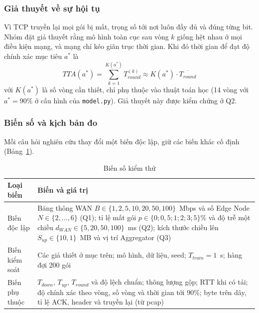 \subsubsection{Giả thuyết về sự hội tụ}
Vì TCP truyền lại mọi gói bị mất, trọng số tới nơi luôn đầy đủ và đúng từng bit. Nhóm đặt giả thuyết rằng mô hình toàn cục sau vòng $k$ giống hệt nhau ở mọi điều kiện mạng, và mạng chỉ kéo giãn trục thời gian. Khi đó thời gian để đạt độ chính xác mục tiêu $a^{*}$ là
\begin{equation}
    TTA(a^{*}) = \sum_{k=1}^{K(a^{*})} T_{round}^{(k)} \approx K(a^{*}) \cdot \overline{T_{round}}
    \label{eq:tta}
\end{equation}
với $K(a^{*})$ là số vòng cần thiết, chỉ phụ thuộc vào thuật toán học (14 vòng với $a^{*} = 90\%$ ở cấu hình của \texttt{model.py}). Giả thuyết này được kiểm chứng ở Q2.

\subsubsection{Biến số và kịch bản đo}
Mỗi câu hỏi nghiên cứu thay đổi một biến độc lập, giữ các biến khác cố định (Bảng~\ref{tab:vars}).

\begin{table}[H]
    \centering
    \caption{Biến số kiểm thử}
    \label{tab:vars}
    \begin{tabularx}{\textwidth}{>{\raggedright\arraybackslash}p{3.0cm} >{\raggedright\arraybackslash}X}
        \toprule
        \textbf{Loại biến} & \textbf{Biến và giá trị} \\
        \midrule
        Biến độc lập & Băng thông WAN $B \in \{1, 2, 5, 10, 20, 50, 100\}$~Mbps và số Edge Node $N \in \{2,\dots,6\}$ (Q1); tỉ lệ mất gói $p \in \{0; 0{,}5; 1; 2; 3; 5\}\%$ và độ trễ một chiều $d_{WAN} \in \{5, 20, 50, 100\}$~ms (Q2); kích thước chiều lên $S_{up} \in \{10, 1\}$~MB và vị trí Aggregator (Q3) \\
        \midrule
        Biến kiểm soát & Các giả thiết ở mục trên; mô hình, dữ liệu, seed; $T_{train} = 1$~s; hàng đợi 200 gói \\
        \midrule
        Biến phụ thuộc & $T_{down}$, $T_{up}$, $T_{round}$ và độ lệch chuẩn; thông lượng gộp; RTT khi có tải; độ chính xác theo vòng, số vòng và thời gian tới 90\%; byte trên dây, tỉ lệ ACK, header và truyền lại (từ pcap) \\
        \bottomrule
    \end{tabularx}
\end{table}

